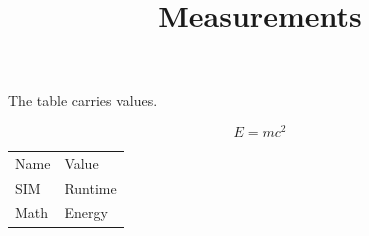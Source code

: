 \title{Measurements}

The table carries values.

\[
E = mc^2
\]

\begin{tabular}{ll}
Name & Value \\
SIM & Runtime \\
Math & Energy
\end{tabular}
